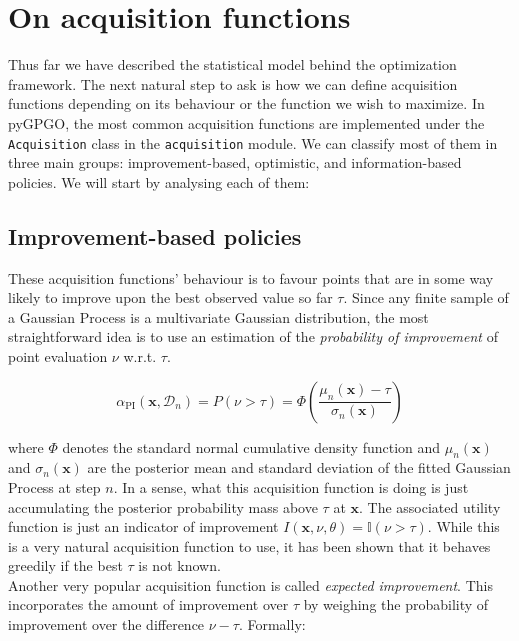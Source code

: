 \documentclass[10pt,a4paper,twoside]{book}
\begin{document}
\section{On acquisition functions}

Thus far we have described the statistical model behind the optimization framework. The next natural step to ask is how we can define acquisition functions depending on its behaviour or the function we wish to maximize. In pyGPGO, the most common acquisition functions are implemented under the \texttt{Acquisition} class in the \texttt{acquisition} module. We can classify most of them in three main groups: improvement-based, optimistic, and information-based policies. We will start by analysing each of them:

\subsection{Improvement-based policies}

These acquisition functions' behaviour is to favour points that are in some way likely to improve upon the best observed value so far $\tau$. Since any finite sample of a Gaussian Process is a multivariate Gaussian distribution, the most straightforward idea is to use an estimation of the \textit{probability of improvement} of point evaluation $\nu$ w.r.t. $\tau$.

\begin{equation}
\alpha_{\mathrm{PI}}(\boldsymbol{x}, \mathcal{D}_n) = P\left(\nu > \tau\right) = \Phi\left(\dfrac{\mu_n(\boldsymbol{x}) - \tau}{\sigma_n(\boldsymbol{x})}  \right)
\end{equation}

where $\Phi$ denotes the standard normal cumulative density function and $\mu_n(\boldsymbol{x})$ and $\sigma_n(\boldsymbol{x})$ are the posterior mean and standard deviation of the fitted Gaussian Process at step $n$. In a sense, what this acquisition function is doing is just accumulating the posterior probability mass above $\tau$ at $\boldsymbol{x}$. The associated utility function is just an indicator of improvement $I(\boldsymbol{x},\nu, \theta) = \mathbb{I}(\nu > \tau)$. While this is a very natural acquisition function to use, it has been shown \cite{Jones2001} that it behaves greedily if the best $\tau$ is not known. \\

Another very popular acquisition function is called \textit{expected improvement}. This incorporates the amount of improvement over $\tau$ by weighing the probability of improvement over the difference $\nu - \tau$. Formally:
\end{document}
